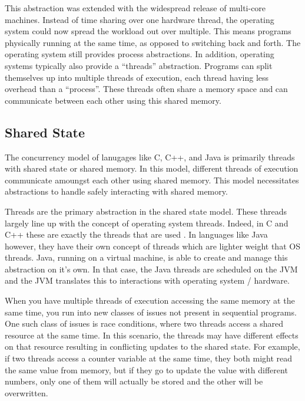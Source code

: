 \documentclass{article}
\begin{document}
This abstraction was extended with the widespread release of multi-core
machines. Instead of time sharing over one hardware thread, the operating system
could now spread the workload out over multiple. This means programs physically
running at the same time, as opposed to switching back and forth. The operating
system still provides process abstractions. In addition, operating systems
typically also provide a ``threads'' abstraction. Programs can split themselves up
into multiple threads of execution, each thread having less overhead than a
``process''. These threads often share a memory space and can communicate between
each other using this shared memory.

\subsection{Shared State}
The concurrency model of lanugages like C, C++, and Java is primarily threads
with shared state or shared memory. In this model, different threads of
execution communicate amoungst each other using shared memory. This model
necessitates abstractions to handle safely interacting with shared memory. \cite{Coursera}

Threads are the primary abstraction in the shared state model. These threads
largely line up with the concept of operating system threads. Indeed, in C and
C++ these are exactly the threads that are used \cite{PPInC, LLNLPOSIX}. In
languages like Java however, they have their own concept of threads which are
lighter weight that OS threads. Java, running on a virtual machine, is able to
create and manage this abstraction on it's own. In that case, the Java threads
are scheduled on the JVM and the JVM translates this to interactions with
operating system / hardware.

When you have multiple threads of execution accessing the same memory at the
same time, you run into new classes of issues not present in sequential
programs. One such class of issues is race conditions, where two threads access
a shared resource at the same time. In this scenario, the threads may have
different effects on that resource resulting in conflicting updates to the
shared state. For example, if two threads access a counter variable at the same
time, they both might read the same value from memory, but if they go to update
the value with different numbers, only one of them will actually be stored and
the other will be overwritten. \cite{Coursera, TuftsCS21, PCTheoryAndPractice}
\end{document}
